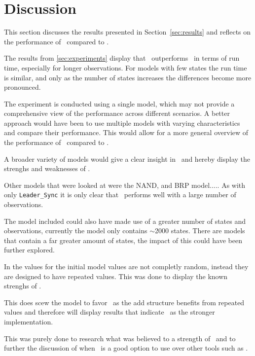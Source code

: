 \section{Discussion}\label{sec:discussion}
This section discusses the results presented in Section~\ref{sec:results} and reflects on the performance of \Cupaal\ compared to \Jajapy.

The results from \autoref{sec:experiments} display that \Cupaal\ outperforms \Jajapy\ in terms of run time, especially for longer observations.
For models with few states the run time is similar, and only as the number of states increases the differences become more pronounced.

The experiment is conducted using a single model, which may not provide a comprehensive view of the performance across different scenarios.
A better approach would have been to use multiple models with varying characteristics and compare their performance.
This would allow for a more general overview of the performance of \Cupaal\ compared to \Jajapy.

A broader variety of models would give a clear insight in \Cupaal\ and hereby display the strenghs and weaknesses of \Cupaal.

Other models that were looked at were the NAND, and BRP model.....
As with only \texttt{Leader\_Sync} it is only clear that \Cupaal\ performs well with a large number of observations.

The model included could also have made use of a greater number of states and observations, currently the model only contains $\sim$2000 states.
There are models that contain a far greater amount of states, the impact of this could have been further explored.

In  the values for the initial model values are not completly random, instead they are designed to have repeated values.
This was done to display the known strenghs of \Cupaal.

This does scew the model to favor \Cupaal\ as the \gls{add} structure benefits from repeated values and therefore will display results that indicate \Cupaal\ as the stronger implementation.

This was purely done to research what was believed to a strength of \Cupaal\ and to further the discussion of when \Cupaal\ is a good option to use over other tools such as \Jajapy.


